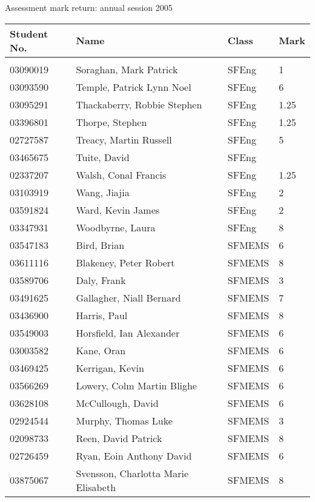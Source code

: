 \documentclass[a4paper]{article}
\begin{document}
\newpage
\begin{center}
Assessment mark return: annual session 2005
\end{center}

\begin{tabular}{llll}
Student No.&Name&Class&Mark\\[3pt]
 \hline\\[3pt]
03090019&Soraghan, Mark Patrick&SFEng&1\\
03093590&Temple, Patrick Lynn Noel&SFEng&6\\
03095291&Thackaberry, Robbie Stephen&SFEng&1.25\\
03396801&Thorpe, Stephen&SFEng&1.25\\
02727587&Treacy, Martin Russell&SFEng&5\\
03465675&Tuite, David&SFEng&\\
02337207&Walsh, Conal Francis&SFEng&1.25\\
03103919&Wang, Jiajia&SFEng&2\\
03591824&Ward, Kevin James&SFEng&2\\
03347931&Woodbyrne, Laura&SFEng&8\\
03547183&Bird, Brian&SFMEMS&6\\
03611116&Blakeney, Peter Robert&SFMEMS&8\\
03589706&Daly, Frank&SFMEMS&3\\
03491625&Gallagher, Niall Bernard&SFMEMS&7\\
03436900&Harris, Paul&SFMEMS&8\\
03549003&Horsfield, Ian Alexander&SFMEMS&6\\
03003582&Kane, Oran&SFMEMS&6\\
03469425&Kerrigan, Kevin&SFMEMS&6\\
03566269&Lowery, Colm Martin Blighe&SFMEMS&6\\
03628108&McCullough, David&SFMEMS&6\\
02924544&Murphy, Thomas Luke&SFMEMS&3\\
02098733&Reen, David Patrick&SFMEMS&8\\
02726459&Ryan, Eoin Anthony David&SFMEMS&6\\
03875067&Svensson, Charlotta Marie Elisabeth&SFMEMS&8\\
\end{tabular}
\end{document}
